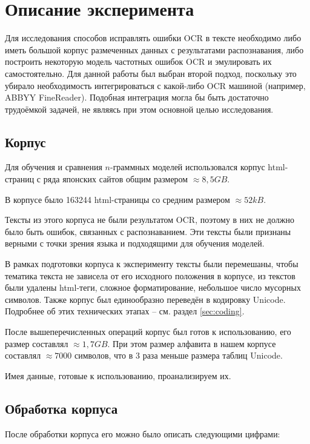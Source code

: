 \section{ Описание эксперимента }\label{sec:experiment}

Для исследования способов исправлять ошибки OCR в тексте необходимо либо иметь большой корпус размеченных данных с результатами распознавания, либо построить некоторую модель частотных ошибок OCR и эмулировать их самостоятельно. Для данной работы был выбран второй подход, поскольку это убирало необходимость интегрироваться с какой-либо OCR машиной (например, ABBYY FineReader). Подобная интеграция могла бы быть достаточно трудоёмкой задачей, не являясь при этом основной целью исследования.

\subsection{ Корпус }

Для обучения и сравнения $n$-граммных моделей использовался корпус html-страниц с ряда японских сайтов  общим размером $\approx 8,5 GB$. 

В корпусе было 163244 html-страницы со средним размером $\approx 52 kB$.

Тексты из этого корпуса не были результатом OCR, поэтому в них не должно было быть ошибок, связанных с распознаванием. Эти тексты были признаны верными с точки зрения языка и подходящими для обучения моделей.

В рамках подготовки корпуса к эксперименту тексты были перемешаны, чтобы тематика текста не зависела от его исходного положения в корпусе, из текстов были удалены html-теги, сложное форматирование, небольшое число мусорных символов. Также корпус был единообразно переведён в кодировку Unicode. Подробнее об этих технических этапах -- см. раздел \cref{sec:coding}.

После вышеперечисленных операций корпус был готов к использованию, его размер составлял $\approx 1,7 GB$. При этом размер алфавита в нашем корпусе составлял $\approx 7000$ символов, что в 3 раза меньше размера таблиц Unicode.

Имея данные, готовые к использованию, проанализируем их.

\subsection{ Обработка корпуса }

После обработки корпуса его можно было описать следующими цифрами:

